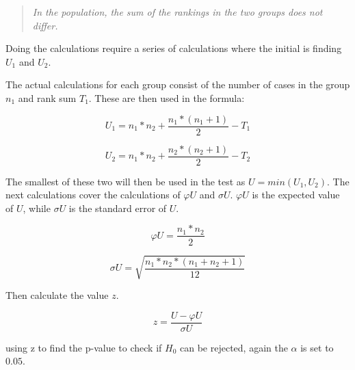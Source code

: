 \begin{quote}
    \textit{In the population, the sum of the rankings in the two groups does not differ.}
\end{quote}

Doing the calculations require a series of calculations where the initial is finding $U_1$ and $U_2$.

The actual calculations for each group consist of the number of cases in the group $n_1$ and rank sum $T_1$. These are then used in the formula:

\begin{equation}
    U_1 = n_1*n_2+\frac{n_1*(n_1+1)}{2}-T_1  
\end{equation}

\begin{equation}
    U_2 = n_1*n_2+\frac{n_2*(n_2+1)}{2}-T_2
\end{equation}

The smallest of these two will then be used in the test as $U=min(U_1,U_2)$. The next calculations cover the calculations of $\varphi U$ and $\sigma U$. $\varphi U$ is the expected value of $U$, while $\sigma U$ is the standard error of $U$.

\begin{equation}
    \varphi U = \frac{n_1*n_2}{2}
\end{equation}

\begin{equation}
    \sigma U = \sqrt{\frac{n_1*n_2*(n_1+n_2+1)}{12}}
\end{equation}

Then calculate the value $z$.

\begin{equation}
    z = \frac{U-\varphi U}{\sigma U}
\end{equation}

using z to find the p-value to check if $H_0$ can be rejected, again the $\alpha$ is set to $0.05$. 

